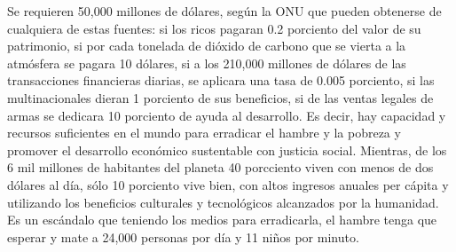 Se requieren 50,000 millones de dólares, según la ONU que pueden obtenerse de cualquiera de estas fuentes: si los ricos pagaran 0.2 porciento del valor de su patrimonio, si por cada tonelada de dióxido de carbono que se vierta a la atmósfera se pagara 10 dólares, si a los 210,000 millones de dólares de las transacciones financieras diarias, se aplicara una tasa de 0.005 porciento, si las multinacionales dieran 1 porciento de sus beneficios, si de las ventas legales de armas se dedicara 10 porciento de ayuda al desarrollo. Es decir, hay capacidad y recursos suficientes en el mundo para erradicar el hambre y la pobreza y promover el desarrollo económico sustentable con justicia social. Mientras, de los 6 mil millones de habitantes del planeta 40 porcciento viven con menos de dos dólares al día, sólo 10 porciento vive bien, con altos ingresos anuales per cápita y utilizando los beneficios culturales y tecnológicos alcanzados por la humanidad. Es un escándalo que teniendo los medios para erradicarla, el hambre tenga que esperar y mate a 24,000 personas por día y 11 niños por minuto.

\endinput
